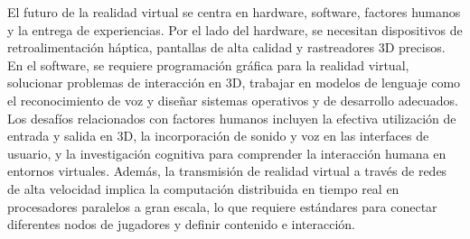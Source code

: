 El futuro de la realidad virtual se centra en hardware, software, factores humanos y la entrega de experiencias. Por el lado del hardware, se necesitan dispositivos de retroalimentación háptica, pantallas de alta calidad y rastreadores 3D precisos. En el software, se requiere programación gráfica para la realidad virtual, solucionar problemas de interacción en 3D, trabajar en modelos de lenguaje como el reconocimiento de voz y diseñar sistemas operativos y de desarrollo adecuados. Los desafíos relacionados con factores humanos incluyen la efectiva utilización de entrada y salida en 3D, la incorporación de sonido y voz en las interfaces de usuario, y la investigación cognitiva para comprender la interacción humana en entornos virtuales. Además, la transmisión de realidad virtual a través de redes de alta velocidad implica la computación distribuida en tiempo real en procesadores paralelos a gran escala, lo que requiere estándares para conectar diferentes nodos de jugadores y definir contenido e interacción. \cite{zheng1998virtual}
